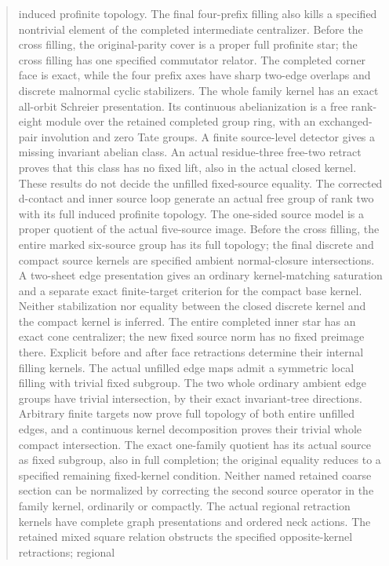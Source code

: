 \documentclass[11pt,a4paper]{article}
\begin{document}
\begin{abstract}
induced profinite topology. The final four-prefix filling also kills a
specified nontrivial element of the completed intermediate centralizer.
Before the cross filling, the original-parity cover is a proper full
profinite star; the cross filling has one specified commutator relator.
The completed corner face is exact, while the four prefix axes have
sharp two-edge overlaps and discrete malnormal cyclic stabilizers.
The whole family kernel has an exact all-orbit Schreier presentation.
Its continuous abelianization is a free rank-eight module over the
retained completed group ring, with an exchanged-pair involution and
zero Tate groups. A finite source-level detector gives a missing
invariant abelian class. An actual residue-three free-two retract
proves that this class has no fixed lift, also in the actual closed
kernel. These results do not decide the unfilled fixed-source equality.
The corrected d-contact and inner source loop generate an actual free
group of rank two with its full induced profinite topology. The one-sided
source model is a proper quotient of the actual five-source image.
Before the cross filling, the entire marked six-source group has its
full topology; the final discrete and compact source kernels are specified
ambient normal-closure intersections. A two-sheet edge presentation gives
an ordinary kernel-matching saturation and a separate exact finite-target
criterion for the compact base kernel. Neither stabilization nor equality
between the closed discrete kernel and the compact kernel is inferred.
The entire completed inner star has an exact cone centralizer;
the new fixed source norm has no fixed preimage there. Explicit before
and after face retractions determine their internal filling kernels.
The actual unfilled edge maps admit a symmetric local filling with
trivial fixed subgroup. The two whole ordinary ambient edge groups have
trivial intersection, by their exact invariant-tree directions.
Arbitrary finite targets now prove full topology of both entire
unfilled edges, and a continuous kernel decomposition proves their
trivial whole compact intersection. The exact one-family quotient has
its actual source as fixed subgroup, also in full completion; the
original equality reduces to a specified remaining fixed-kernel
condition. Neither named retained coarse section can be normalized by
correcting the second source operator in the family kernel, ordinarily
or compactly. The actual regional retraction kernels have complete
graph presentations and ordered neck actions. The retained mixed square
relation obstructs the specified opposite-kernel retractions; regional

\end{abstract}
\end{document}
